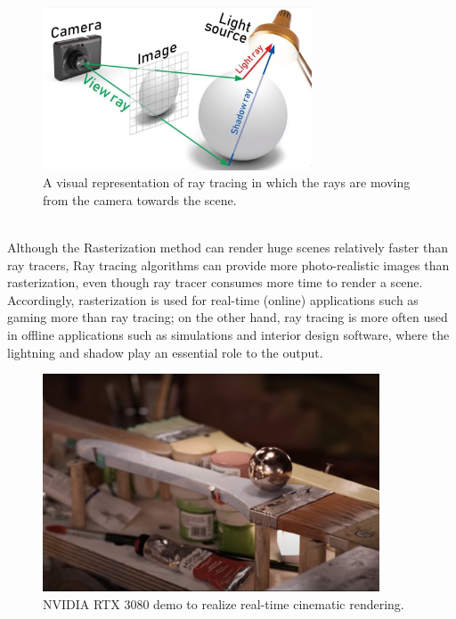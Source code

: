 \documentclass[11pt,a4paper]{article}
\begin{document}
\begin{figure}[h]	
     \centering
     \captionsetup{justification=centering,margin=2cm}
     \includegraphics[width=8cm]{images/raytracer_2.jpg}
     \caption{A visual representation of ray tracing in which the rays are moving from the camera towards the scene. \protect\cite{Kimathi2020}}
     \label{fig:raytracer}
\end{figure}

\noindent
\\
Although the Rasterization method can render huge scenes relatively faster than ray tracers, Ray tracing algorithms can provide more photo-realistic images than rasterization, even though ray tracer consumes more time to render a scene. Accordingly, rasterization is used for real-time (online) applications such as gaming more than ray tracing; on the other hand, ray tracing is more often used in offline applications such as simulations and interior design software, where the lightning and shadow play an essential role to the output.
\clearpage

\begin{figure}[h]	
     \centering
     \captionsetup{justification=centering,margin=2cm}
     \includegraphics[width=10cm]{images/marbel_brush.png}
     \caption{NVIDIA RTX 3080 demo to realize real-time cinematic rendering.
\protect\cite{Burke2018}}
     \label{fig:rtxdemo}
\end{figure}
\end{document}

